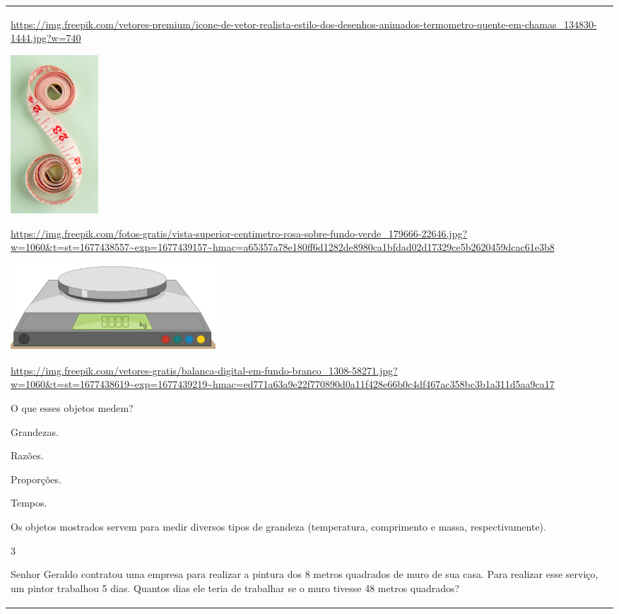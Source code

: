 \begin{mdframed}[linewidth=2pt,linecolor=salmao,roundcorner=2pt]
\begin{escolha}
{{{\begin{longtable}[]{@{}l@{}}
\begin{itemize}
\url{https://img.freepik.com/vetores-premium/icone-de-vetor-realista-estilo-dos-desenhos-animados-termometro-quente-em-chamas_134830-1444.jpg?w=740}

\includegraphics[width=1.29167in,height=2.33463in]{media/image129.png}

\url{https://img.freepik.com/fotos-gratis/vista-superior-centimetro-rosa-sobre-fundo-verde_179666-22646.jpg?w=1060\&t=st=1677438557~exp=1677439157~hmac=a65357a78e180ff6d1282de8980ca1bfdad02d17329ce5b2620459dcac61e3b8}

\includegraphics[width=3.02500in,height=1.27488in]{media/image130.png}

\url{https://img.freepik.com/vetores-gratis/balanca-digital-em-fundo-branco_1308-58271.jpg?w=1060\&t=st=1677438619~exp=1677439219~hmac=ed771a63a9e22f770890d0a11f428e66b0c4df467ac358bc3b1a311d5aa9ca17}

O que esses objetos medem?

\begin{escolha}
\item
  Grandezas.
\item
  Razões.
\item
  Proporções.
\item
  Tempos.
\end{escolha}

Os objetos mostrados servem para medir diversos tipos de grandeza (temperatura, comprimento e massa, respectivamente).

\num{3}

Senhor Geraldo contratou uma empresa para realizar a pintura dos 8
metros quadrados de muro de sua casa. Para realizar esse serviço, um pintor
trabalhou 5 dias. Quantos dias ele teria de trabalhar se o muro tivesse
48 metros quadrados?


\end{itemize}
\end{longtable}}}}
\end{escolha}
\end{mdframed}
